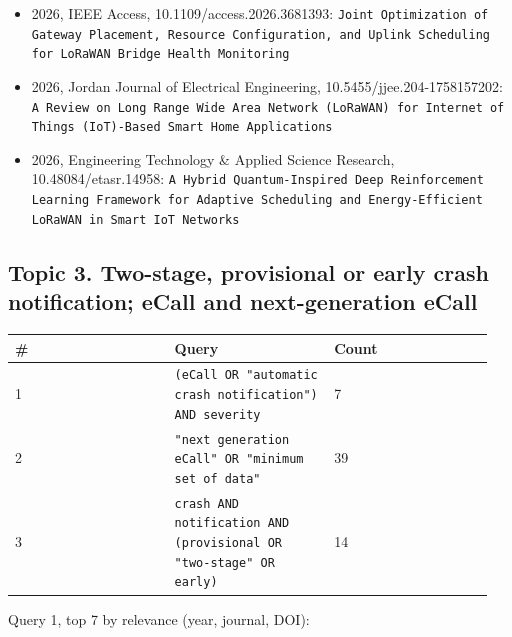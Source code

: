 \begin{itemize}
\item 2026, IEEE Access, 10.1109/access.2026.3681393: \texttt{Joint Optimization of Gateway Placement, Resource Configuration, and Uplink Scheduling for LoRaWAN Bridge Health Monitoring}
\item 2026, Jordan Journal of Electrical Engineering, 10.5455/jjee.204-1758157202: \texttt{A Review on Long Range Wide Area Network (LoRaWAN) for Internet of Things (IoT)-Based Smart Home Applications}
\item 2026, Engineering Technology \& Applied Science Research, 10.48084/etasr.14958: \texttt{A Hybrid Quantum-Inspired Deep Reinforcement Learning Framework for Adaptive Scheduling and Energy-Efficient LoRaWAN in Smart IoT Networks}
\end{itemize}

\subsection*{Topic 3. Two-stage, provisional or early crash notification; eCall and next-generation eCall}

{\scriptsize\raggedright
\begin{longtable}{p{0.317\linewidth}p{0.317\linewidth}p{0.317\linewidth}}
\toprule
\# & Query & Count \\
\midrule
\endhead
1 & \texttt{(eCall OR "automatic crash notification") AND severity} & 7 \\
2 & \texttt{"next generation eCall" OR "minimum set of data"} & 39 \\
3 & \texttt{crash AND notification AND (provisional OR "two-stage" OR early)} & 14 \\
\bottomrule
\end{longtable}}

Query 1, top 7 by relevance (year, journal, DOI):

